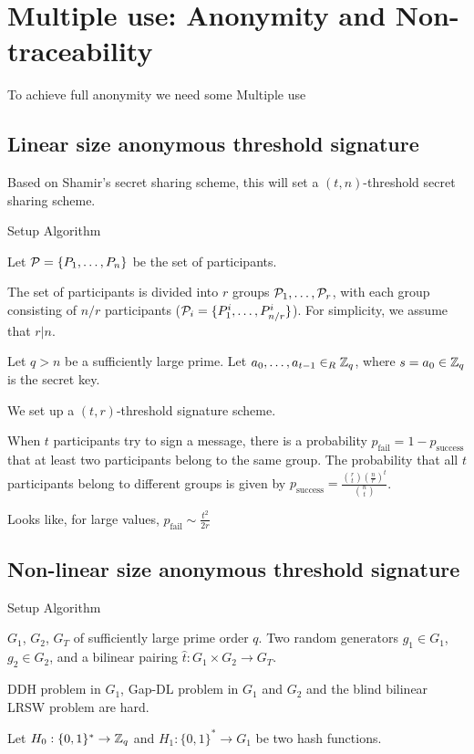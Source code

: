 \chapter{Multiple use: Anonymity and Non-traceability}
To achieve full anonymity we need some 
Multiple use 


\section{Linear size anonymous threshold signature}
\cite{DazaDSV09}

Based on Shamir's secret sharing scheme, this will set a $(t,n)$-threshold secret sharing scheme.

Setup Algorithm

Let ${\mathcal P} = \{P_1 , \dots , P_n \}$ be the set of participants.

The set of participants is divided into $r$ groups ${\mathcal P}_1, \dots , {\mathcal P}_r$, with each group consisting of $n/r$ participants (${\mathcal P}_i = \{P^i_1, \dots , P^i_{n/r}\}$). For simplicity, we assume that $r \vert n$.

Let $q > n$ be a sufficiently large prime. Let $a_0, \dots , a_{t-1} \in_R {\mathbb Z}_q$, where $s=a_0 \in {\mathbb Z}_q$ is the secret key.

We set up a $(t,r)$-threshold signature scheme.

When $t$ participants try to sign a message, there is a probability $p_{\text{fail}} = 1 - p_{\text{success}}$ that at least two participants belong to the same group. The probability that all $t$ participants belong to different groups is given by $p_{\text{success}} = \frac{\binom{r}{t} \left( \frac{n}{r} \right)^{t}}{\binom{n}{t}}$.

Looks like, for large values, $p_{\text{fail}} \sim \frac{t^2}{2r}$



\section{Non-linear size anonymous threshold signature}
\cite{ChenNW11}
Setup Algorithm

$G_1$, $G_2$, $G_T$ of sufficiently large prime order $q$. Two random generators $g_1 \in G_1$, $g_2 \in G_2$, and a bilinear pairing $\hat{t}: G_1 \times G_2 \rightarrow G_T$.

DDH problem in $G_1$, Gap-DL problem in $G_1$ and $G_2$ and the blind bilinear LRSW problem are hard.

Let $H_0 : \{0,1\}^\ast \rightarrow {\mathbb Z}_q$ and $H_1 : \{ 0 , 1 \}^\ast \rightarrow G_1$ be two hash functions.

